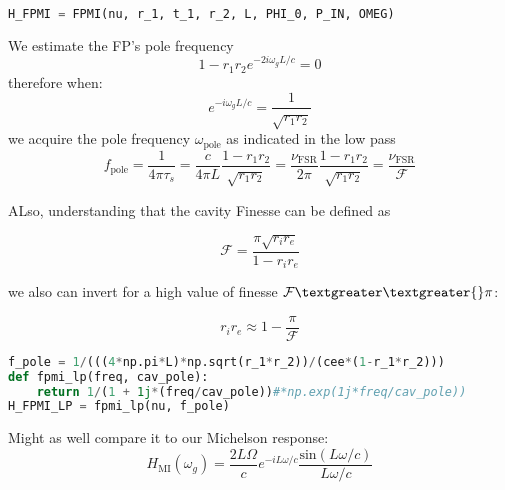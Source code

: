 \begin{spacing}{1} \begin{lstlisting}[frame=single, language=Python]
H_FPMI = FPMI(nu, r_1, t_1, r_2, L, PHI_0, P_IN, OMEG)
\end{lstlisting} \end{spacing}

We estimate the FP's pole frequency
\begin{equation}  1 - r_1 r_2 e^{-2i \omega_g L / c} = 0 \end{equation} therefore when:
\begin{equation} e^{-i \omega_g L / c} = \frac{1}{\sqrt{r_1 r_2}} \end{equation} we acquire the
pole frequency \(\omega_\mathrm{pole}\) as indicated in the low pass
\begin{equation} f_\mathrm{pole} = \frac{1}{4\pi \tau_{s}} =  \frac{c}{4 \pi L} \frac{1- r_1 r_2}{\sqrt{r_1 r_2}} = \frac{\nu_\mathrm{FSR}}{2 \pi} \frac{1- r_1 r_2}{\sqrt{r_1 r_2}} = \frac{\nu_\mathrm{FSR}}{\mathcal{F}} \end{equation}

ALso, understanding that the cavity Finesse can be defined as

\begin{equation} \mathcal{F} = \frac{\pi \sqrt{r_i r_e}}{1- r_i r_e} \end{equation}

we also can invert for a high value of finesse $ \mathcal{F} \textgreater\textgreater{} \pi $:

\begin{equation} r_i r_e \approx 1 - \frac{\pi}{\mathcal{F}} \end{equation}

\begin{spacing}{1} \begin{lstlisting}[frame=single, language=Python]
f_pole = 1/(((4*np.pi*L)*np.sqrt(r_1*r_2))/(cee*(1-r_1*r_2)))
def fpmi_lp(freq, cav_pole):
    return 1/(1 + 1j*(freq/cav_pole))#*np.exp(1j*freq/cav_pole))
H_FPMI_LP = fpmi_lp(nu, f_pole)
\end{lstlisting} \end{spacing}

Might as well compare it to our Michelson response:
\begin{equation} H_{\mathrm{MI}}(\omega_g) = \frac{2 L \Omega}{c}e^{-i L \omega / c} \frac{\mathrm{sin}(L \omega /c)}{L \omega /c} \end{equation}

